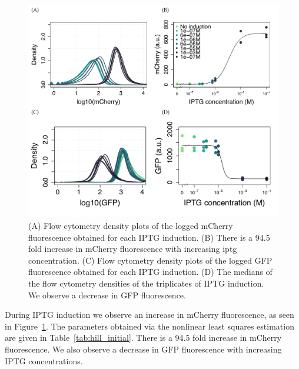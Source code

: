 


\begin{figure}[tb]
	\begin{center}
\includegraphics[width=\textwidth]{../../chapters/chapterABCFlow/images/pKDL071_concentrations_model_fit.pdf}
\caption[Characterisation of pKDL071 after \acrshort{iptg} induction]{\label{fig:switch_concentrations_model} (A) Flow cytometry density plots of the logged mCherry fluorescence obtained for each IPTG induction. (B) There is a 94.5 fold increase in mCherry fluorescence with increasing \acrshort{iptg} concentration. (C) Flow cytometry density plots of the logged GFP fluorescence obtained for each IPTG induction. (D) The medians of the flow cytometry densities of the triplicates of IPTG induction. We observe a decrease in GFP fluorescence.}
\end{center}
\end{figure}


During IPTG induction we observe an increase in mCherry fluorescence, as seen in Figure~\ref{fig:switch_concentrations_model}. The parameters obtained via the nonlinear least squares estimation are given in Table~\ref{tab:hill_initial}. There is a 94.5 fold increase in mCherry fluorescence.  We also observe a decrease in GFP fluorescence with increasing IPTG concentrations. 


